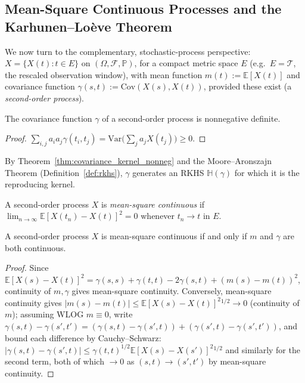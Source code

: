 \subsection{Mean-Square Continuous Processes and the Karhunen--Lo\`eve
Theorem}
\label{subsec:kl_theorem}

We now turn to the complementary, stochastic-process perspective: $X=
\{X(t):t\in E\}$ on $(\Omega,\mathcal{F},\mathbb{P})$, for a compact
metric space $E$ (e.g.\ $E=\mathcal{T}$, the rescaled observation window),
with mean function $m(t):=\mathbb{E}[X(t)]$ and covariance function
$\gamma(s,t):=\mathrm{Cov}(X(s),X(t))$, provided these exist (a
\emph{second-order process}).

\begin{theorem}
\label{thm:covariance_kernel_nonneg}
The covariance function $\gamma$ of a second-order process is nonnegative
definite.
\end{theorem}

\begin{proof}
$\sum_{i,j}a_ia_j\gamma(t_i,t_j) = \mathrm{Var}\big(\sum_ja_jX(t_j)\big)
\geq 0$.
\end{proof}

By Theorem~\ref{thm:covariance_kernel_nonneg} and the Moore--Aronszajn
Theorem (Definition~\ref{def:rkhs}), $\gamma$ generates an RKHS
$\mathbb{H}(\gamma)$ for which it is the reproducing kernel.

\begin{definition}
\label{def:ms_continuous}
A second-order process $X$ is \emph{mean-square continuous} if
$\lim_{n\to\infty}\mathbb{E}[X(t_n)-X(t)]^2=0$ whenever $t_n\to t$ in $E$.
\end{definition}

\begin{theorem}
\label{thm:ms_continuity_char}
A second-order process $X$ is mean-square continuous if and only if $m$
and $\gamma$ are both continuous.
\end{theorem}

\begin{proof}
Since $\mathbb{E}[X(s)-X(t)]^2 = \gamma(s,s)+\gamma(t,t)-2\gamma(s,t)+
(m(s)-m(t))^2$, continuity of $m,\gamma$ gives mean-square continuity.
Conversely, mean-square continuity gives $|m(s)-m(t)|\leq\mathbb{E}[X(s)-
X(t)]^2{}^{1/2}\to 0$ (continuity of $m$); assuming WLOG $m\equiv 0$,
write $\gamma(s,t)-\gamma(s',t') = (\gamma(s,t)-\gamma(s',t)) +
(\gamma(s',t)-\gamma(s',t'))$, and bound each difference by
Cauchy--Schwarz: $|\gamma(s,t)-\gamma(s',t)|\leq\gamma(t,t)^{1/2}
\mathbb{E}[X(s)-X(s')]^2{}^{1/2}$ and similarly for the second term, both
of which $\to 0$ as $(s,t)\to(s',t')$ by mean-square continuity.
\end{proof}

